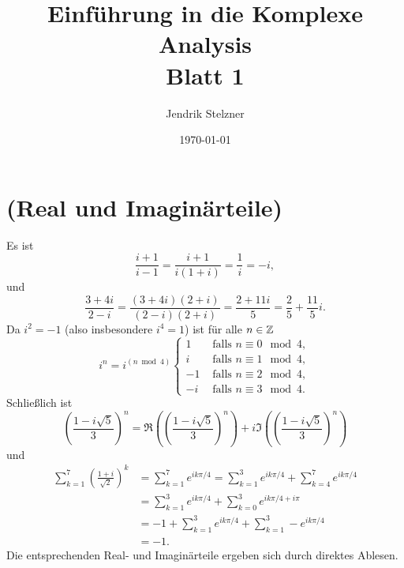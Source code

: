 \documentclass[a4paper,10pt]{article}
\title{\sc Einführung in die Komplexe Analysis \\ \Large Blatt 1}
\author{Jendrik Stelzner}
\date{\today}
\begin{document}
\maketitle





\section{(Real und Imaginärteile)}
Es ist
\[
 \frac{i+1}{i-1} = \frac{i+1}{i(1+i)} = \frac{1}{i} = -i,
\]
und
\[
 \frac{3+4i}{2-i} = \frac{(3+4i)(2+i)}{(2-i)(2+i)} = \frac{2+11i}{5} = \frac{2}{5} + \frac{11}{5}i.
\]
Da $i^2 = -1$ (also insbesondere $i^4 = 1$) ist für alle $n \in \mathbb{Z}$
\[
 i^n =
 i^{(n \bmod 4)}
 \begin{cases}
   1 & \text{ falls } n \equiv 0 \mod 4, \\
   i & \text{ falls } n \equiv 1 \mod 4, \\
  -1 & \text{ falls } n \equiv 2 \mod 4, \\
  -i & \text{ falls } n \equiv 3 \mod 4.
 \end{cases}
\]
Schließlich ist
\[
 \left(\frac{1-i\sqrt{5}}{3}\right)^n
 = \Re \left( \left(\frac{1-i\sqrt{5}}{3}\right)^n \right) + i \Im \left( \left(\frac{1-i\sqrt{5}}{3}\right)^n \right)
\]
und
\begin{align*}
 \sum_{k=1}^7 \left(\frac{1+i}{\sqrt{2}}\right)^k
 &= \sum_{k=1}^7 e^{ik\pi/4}
 = \sum_{k=1}^3 e^{ik\pi/4} + \sum_{k=4}^7 e^{ik\pi/4} \\
 &= \sum_{k=1}^3 e^{ik\pi/4} + \sum_{k=0}^3 e^{ik\pi/4+i\pi} \\
 &= -1 + \sum_{k=1}^3 e^{ik\pi/4} + \sum_{k=1}^3 -e^{ik\pi/4} \\
 &= -1.
\end{align*}
Die entsprechenden Real- und Imaginärteile ergeben sich durch direktes Ablesen.
\end{document}
